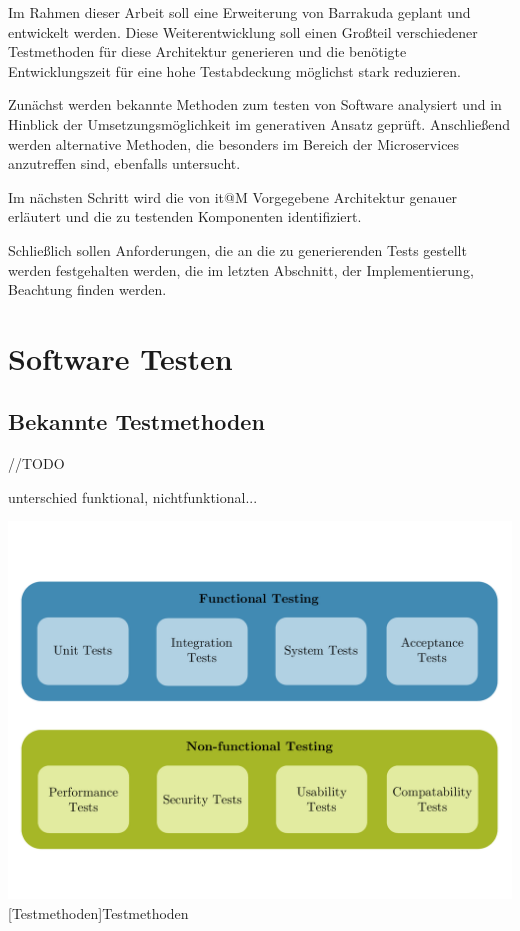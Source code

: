 \documentclass[12pt,a4paper,bibliography=totocnumbered,listof=totocnumbered]{scrartcl}
\begin{document}
Im Rahmen dieser Arbeit soll eine Erweiterung von Barrakuda geplant und entwickelt werden. Diese Weiterentwicklung soll einen Großteil verschiedener Testmethoden für diese Architektur generieren und die benötigte Entwicklungszeit für eine hohe Testabdeckung möglichst stark reduzieren.

Zunächst werden bekannte Methoden zum testen von Software analysiert und in Hinblick der Umsetzungsmöglichkeit im generativen Ansatz geprüft. Anschließend werden alternative Methoden, die besonders im Bereich der Microservices anzutreffen sind, ebenfalls untersucht.

Im nächsten Schritt wird die von it@M Vorgegebene Architektur genauer erläutert und die zu testenden Komponenten identifiziert.

Schließlich sollen Anforderungen, die an die zu generierenden Tests gestellt werden festgehalten werden, die im letzten Abschnitt, der Implementierung, Beachtung finden werden.


\section{Software Testen}

\subsection{Bekannte Testmethoden}

//TODO

unterschied funktional, nichtfunktional...

\vspace{1em}
\begin{minipage}{\linewidth}
	\centering
	\includegraphics[width=0.9\linewidth]{images/img_testmethods.pdf}
	[Testmethoden]{Testmethoden\cite{TODO}}
	\label{fig:img_testmethods}
\end{minipage}
\end{document}
